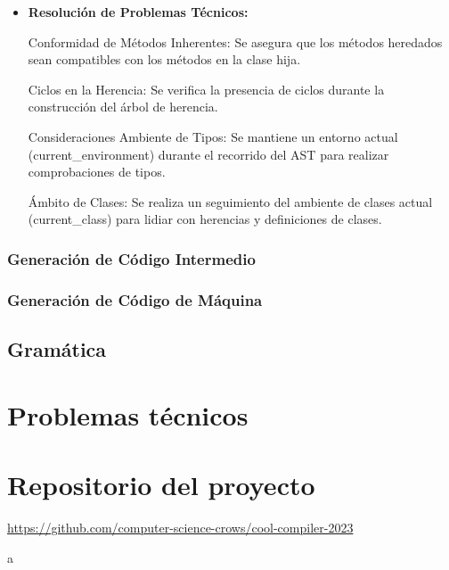 \documentclass[10pt]{article} %
\begin{document}
\begin{itemize}
	\item \textbf{Resolución de Problemas Técnicos:}
	
	Conformidad de Métodos Inherentes: Se asegura que los métodos heredados sean compatibles con los métodos en la clase hija.
	
	Ciclos en la Herencia: Se verifica la presencia de ciclos durante la construcción del árbol de herencia.
	
	Consideraciones
	Ambiente de Tipos: Se mantiene un entorno actual (current\_environment) durante el recorrido del AST para realizar comprobaciones de tipos.
	
	Ámbito de Clases: Se realiza un seguimiento del ambiente de clases actual (current\_class) para lidiar con herencias y definiciones de clases.
	
	\end{itemize}
	
	\subsubsection{Generaci\'on de C\'odigo Intermedio}
	
	\subsubsection{Generaci\'on de C\'odigo de M\'aquina}
	
	\subsection{Gram\'atica}
	
	\section{Problemas técnicos}
	
	\section*{Repositorio del proyecto}
	\begin{center}
		\url{https://github.com/computer-science-crows/cool-compiler-2023}
	\end{center}
	
	\begin{thebibliography}
		a
	\end{thebibliography}
\end{document}
